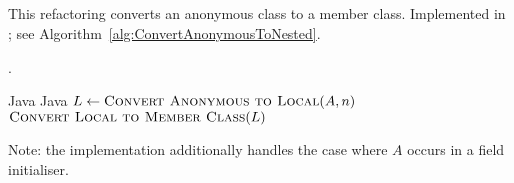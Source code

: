 \subsection{}
This refactoring converts an anonymous class to a member class. Implemented in ; see Algorithm~\ref{alg:ConvertAnonymousToNested}.


\begin{algorithm}[p]
\caption{$\refactoring{Convert Anonymous to Nested}(A : \type{AnonymousClass}, n : \type{Name}) : \type{MemberType}$}\label{alg:ConvertAnonymousToNested}.
\begin{algorithmic}[1]
\REQUIRE Java
\ENSURE Java
\medskip
\STATE $L \leftarrow \textsc{Convert Anonymous to Local}(A, n)$
\RETURN $\textsc{Convert Local to Member Class}(L)$
\end{algorithmic}
\end{algorithm}

Note: the implementation additionally handles the case where $A$ occurs in a field initialiser.

